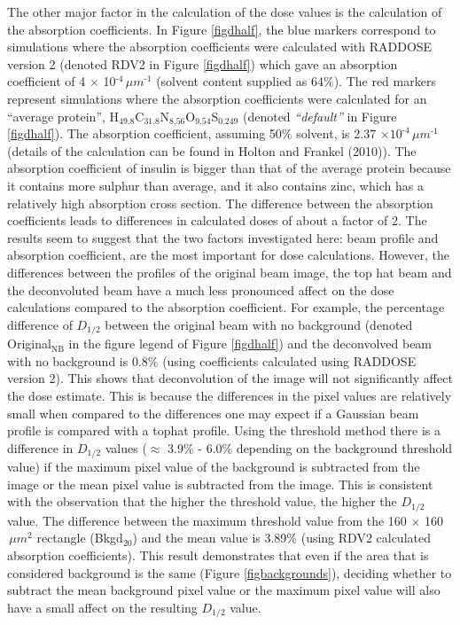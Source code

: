 The other major factor in the calculation of the dose values is the calculation of the absorption coefficients.
In Figure \ref{figdhalf}, the blue markers correspond to simulations where the absorption coefficients were calculated with RADDOSE version 2 \cite{pait2009} (denoted RDV2 in Figure \ref{figdhalf}) which gave an absorption coefficient of 4 $\times$ 10$^{\text{-4}}\, \mu m^{\text{-1}}$ (solvent content supplied as 64\%).
The red markers represent simulations where the absorption coefficients were calculated for an ``average protein'', H$_{\text{49.8}}$C$_{\text{31.8}}$N$_{\text{8.56}}$O$_{\text{9.54}}$S$_{\text{0.249}}$ (denoted \textit{``default''} in Figure \ref{figdhalf}).
The absorption coefficient, assuming 50\% solvent, is 2.37 $\times 10^{\text{-4}}\, \mu m^{\text{-1}}$ (details of the calculation can be found in Holton and Frankel (2010)).
The absorption coefficient of insulin is bigger than that of the average protein because it contains more sulphur than average, and it also contains zinc, which has a relatively high absorption cross section.
The difference between the absorption coefficients leads to differences in calculated doses of about a factor of 2.
\newline
The results seem to suggest that the two factors investigated here: beam profile and absorption coefficient, are the most important for dose calculations.
However, the differences between the profiles of the original beam image, the top hat beam and the deconvoluted beam have a much less pronounced affect on the dose calculations compared to the absorption coefficient.
For example, the percentage difference of $D_{1/2}$ between the original beam with no background (denoted Original$_{\text{NB}}$ in the figure legend of Figure \ref{figdhalf}) and the deconvolved beam with no background is 0.8\% (using coefficients calculated using RADDOSE version 2).
This shows that deconvolution of the image will not significantly affect the dose estimate.
This is because the differences in the pixel values are relatively small when compared to the differences one may expect if a Gaussian beam profile is compared with a tophat profile.
\newline
Using the threshold method there is a difference in $D_{1/2}$ values ($\approx$ 3.9\% - 6.0\% depending on the background threshold value) if the maximum pixel value of the background is subtracted from the image or the mean pixel value is subtracted from the image.
This is consistent with the observation that the higher the threshold value, the higher the $D_{1/2}$ value.
The difference between the maximum threshold value from the 160 $\times$ 160$\, \mu m^2$ rectangle (Bkgd$_{\text{20}}$) and the mean value is 3.89\% (using RDV2 calculated absorption coefficients).
This result demonstrates that even if the area that is considered background is the same (Figure \ref{figbackgrounds}), deciding whether to subtract the mean background pixel value or the maximum pixel value will also have a small affect on the resulting $D_{1/2}$ value.

